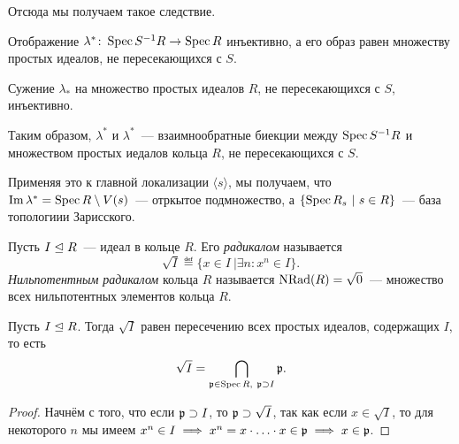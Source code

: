 	Отсюда мы получаем такое следствие. 

	\begin{corollary}
		Отображение $\lambda^*\colon \operatorname{Spec}{S^{-1}R} \to \operatorname{Spec}{R}$ инъективно, а его образ равен множеству простых идеалов, не пересекающихся с $S$. 

		Сужение $\lambda_*$ на множество простых идеалов $R$, не пересекающихся с $S$, инъективно.

		Таким образом, $\lambda^{*}$ и $\lambda^{*}$~--- взаимнообратные биекции между $\operatorname{Spec}{S^{-1}R}$ и множеством простых иедалов кольца $R$, не пересекающихся с $S$.
	\end{corollary}

	Применяя это к главной локализации $\langle s \rangle$, мы получаем, что $\mathop{\mathrm{Im}}\nolimits{\lambda^{*}} = \operatorname{Spec}{R}\setminus V(s)$~--- отркытое подмножество, а  $\{ \operatorname{Spec}{R_{s}} \ \vert \ s \in R\}$~--- база топологиии Зарисского. 

	\begin{definition} 
		Пусть $I \trianglelefteq R$~--- идеал в кольце $R$. Его \emph{радикалом} называется 
		\[
			\sqrt{I} \eqdef \{x \in I \ \vert \exists n \colon x^n \in I  \}.
		\]
		\emph{Нильпотентным радикалом} кольца $R$ называется $\operatorname{NRad}(R) = \sqrt{0}$~---  множество всех нильпотентных элементов кольца $R$. 
	\end{definition}

	\begin{theorem} 
		Пусть $I \trianglelefteq R$. Тогда $\sqrt{I}$ равен пересечению всех простых идеалов, содержащих $I$, то есть 
		\[
			\sqrt{I} = \bigcap_{\mathfrak{p} \in \operatorname{Spec}{R}, \ \mathfrak{p} \supset I} \mathfrak{p}. 
		\]
	\end{theorem}
	\begin{proof}
		Начнём с того, что если $\mathfrak{p} \supset I$, то $\mathfrak{p} \supset \sqrt{I}$, так как если $x \in \sqrt{I}$, то для некоторого $n$ мы имеем $x^n \in I \implies x^n = x \cdot \ldots \cdot x \in \mathfrak{p} \implies x \in \mathfrak{p}$.
	\end{proof}

	






